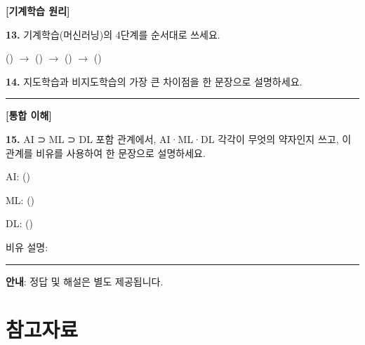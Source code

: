 \documentclass[11pt,a4paper]{article}
\begin{document}
\bigskip\bigskip

\noindent\textbf{[기계학습 원리]}

\bigskip

\noindent\textbf{13.} 기계학습(머신러닝)의 4단계를 순서대로 쓰세요.

\vspace{0.5cm}
\noindent (\hspace{3cm}) $\rightarrow$ (\hspace{3cm}) $\rightarrow$ (\hspace{3cm}) $\rightarrow$ (\hspace{3cm})

\vspace{1.5cm}

\noindent\textbf{14.} 지도학습과 비지도학습의 가장 큰 차이점을 한 문장으로 설명하세요.

\vspace{2.5cm}
\noindent\rule{\textwidth}{0.4pt}

\bigskip\bigskip

\noindent\textbf{[통합 이해]}

\bigskip

\noindent\textbf{15.} AI ⊃ ML ⊃ DL 포함 관계에서, AI·ML·DL 각각이 무엇의 약자인지 쓰고, 이 관계를 비유를 사용하여 한 문장으로 설명하세요.

\vspace{0.5cm}
\noindent AI: (\hspace{6cm})

\vspace{0.3cm}
\noindent ML: (\hspace{6cm})

\vspace{0.3cm}
\noindent DL: (\hspace{6cm})

\vspace{0.5cm}
\noindent 비유 설명:

\vspace{2.5cm}
\noindent\rule{\textwidth}{0.4pt}

\vspace{1cm}

\begin{tcolorbox}[colback=gray!5, colframe=gray!40]
 \textbf{안내}: 정답 및 해설은 별도 제공됩니다.
\end{tcolorbox}

\newpage

\section*{참고자료}
\end{document}
